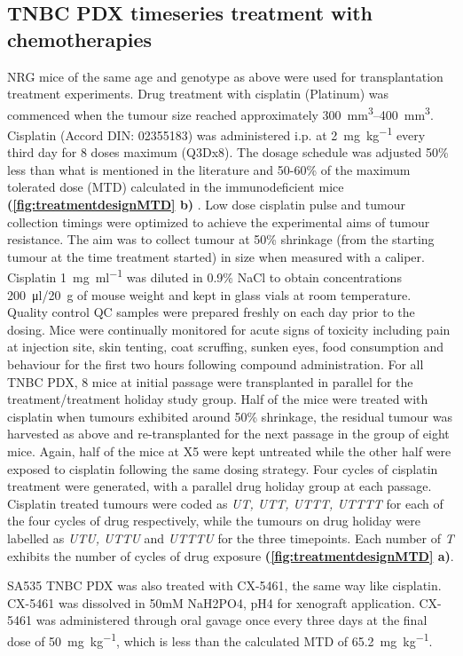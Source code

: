 \subsection{TNBC PDX timeseries treatment with chemotherapies}
\label{ssec:rx}
NRG mice of the same age and genotype as above were used for transplantation treatment experiments. Drug treatment with cisplatin (Platinum) was commenced when the tumour size reached approximately \SIrange{300}{400}{\mm\cubed}. Cisplatin (Accord DIN: 02355183)  was administered i.p. at \SI{2}{\mg\per\kg} every third day for 8 doses maximum (Q3Dx8). The dosage schedule was adjusted 50\% less than what is mentioned in the literature \cite{li2013enhanced,wang2013klotho} and 50-60\%  of the maximum tolerated dose (MTD) calculated in the immunodeficient mice  \textbf{(\autoref{fig:treatmentdesignMTD} b)} . Low dose cisplatin pulse and tumour collection timings were optimized to achieve the experimental aims of tumour resistance. The aim was to collect tumour at 50\% shrinkage (from the starting tumour at the time treatment started) in size when measured with a caliper. Cisplatin \SI{1}{\mg\per\ml} was diluted in 0.9\% NaCl to obtain concentrations \SI{200}{\ul}/\SI{20}{\g} of mouse weight and kept in glass vials at room temperature. Quality control \ac{QC} samples were prepared freshly on each day prior to the dosing. Mice were continually monitored for acute signs of toxicity including pain at injection site, skin tenting, coat scruffing, sunken eyes, food consumption and behaviour for the first two hours following compound administration. For all TNBC PDX, 8 mice at initial passage were transplanted in parallel for the treatment/treatment holiday study group. Half of the mice were treated with cisplatin when tumours exhibited around 50\% shrinkage, the residual tumour was harvested as above and re-transplanted for the next passage in the group of eight mice. Again, half of the mice at X5 were kept untreated while the other half were exposed to cisplatin following the same dosing strategy. Four cycles of cisplatin treatment were generated, with a parallel drug holiday group at each passage. Cisplatin treated tumours were coded as \textit{UT, UTT, UTTT, UTTTT} for each of the four cycles of drug respectively, while the tumours on drug holiday were labelled as \textit{UTU, UTTU} and \textit{UTTTU} for the three timepoints. Each number of \textit{T} exhibits the number of cycles of drug exposure \textbf{(\autoref{fig:treatmentdesignMTD} a)}. 

SA535 TNBC PDX was also treated with CX-5461, the same way like cisplatin. CX-5461 was dissolved in 50mM NaH2PO4, pH4 for xenograft application. CX-5461 was administered through oral gavage once every three days at the final dose of \SI{50}{\mg\per\kg}, which is less than the calculated MTD of \SI{65.2}{\mg\per\kg}.

